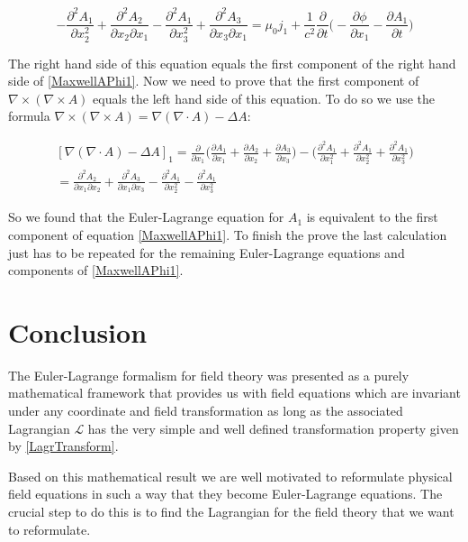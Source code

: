 \documentclass{article}
\begin{document}
\begin{equation}
 - \frac{\partial^2 A_1}{\partial x_2^2} + \frac{\partial^2 A_2}{\partial x_2 \partial x_1}
- \frac{\partial^2 A_1}{\partial x_3^2} + \frac{\partial^2 A_3}{\partial x_3 \partial x_1}
= \mu_0 j_1 
+ \frac{1}{c^2} \frac{\partial}{\partial t} \bigg(-\frac{\partial \phi}{\partial x_1} - \frac{\partial A_1}{\partial t} \bigg)
\end{equation}

The right hand side of this equation equals the first component of the right hand side of \ref{MaxwellAPhi1}. Now we need to prove that the first component of $\nabla \times ( \nabla \times A)$ equals the left hand side of this equation. To do so we use the formula 
$\nabla \times ( \nabla \times A) = \nabla(\nabla \cdot A) - \Delta A$:

\begin{equation}
\begin{split}
[\nabla(\nabla \cdot A) - \Delta A]_1 = 
\frac{\partial}{\partial x_1} \bigg( \frac{\partial A_1}{\partial x_1} + \frac{\partial A_2}{\partial x_2} + \frac{\partial A_3}{\partial x_3} \bigg)
- \bigg( \frac{\partial^2 A_1}{\partial x_1^2} + \frac{\partial^2 A_1}{\partial x_2^2} + \frac{\partial^2 A_1}{\partial x_3^2} \bigg) 
\\
= 
\frac{\partial^2 A_2}{\partial x_1 \partial x_2} + \frac{\partial^2 A_3}{\partial x_1 \partial x_3}
- \frac{\partial^2 A_1}{\partial x_2^2} - \frac{\partial^2 A_1}{\partial x_3^2} 
\end{split}
\end{equation}

So we found that the Euler-Lagrange equation for $A_1$ is equivalent to the first component of equation \ref{MaxwellAPhi1}. To finish the prove the last calculation just has to be repeated for the remaining Euler-Lagrange equations and components of \ref{MaxwellAPhi1}.

\section{Conclusion}
The Euler-Lagrange formalism for field theory was presented as a purely mathematical framework that provides us with field equations which are invariant under any coordinate and field transformation as long as the associated Lagrangian $\mathcal{L}$ has  the very simple and well defined transformation property given by \ref{LagrTransform}.

Based on this mathematical result we are well motivated to reformulate physical field equations in such a way that they become Euler-Lagrange equations. The crucial step to do this is to find the Lagrangian for the field theory that we want to reformulate.
\end{document}
